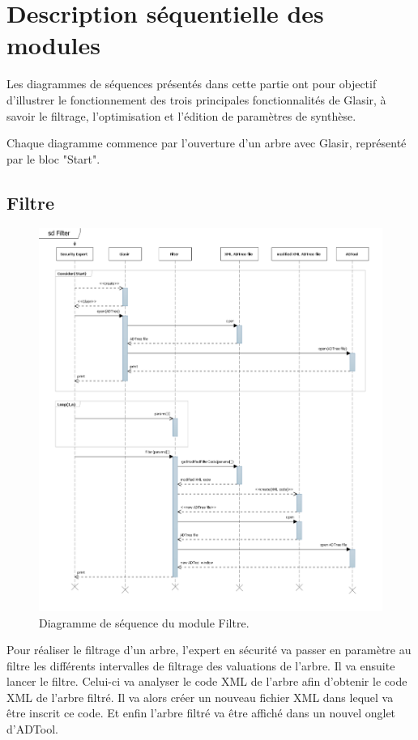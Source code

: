 \section{Description séquentielle des modules}
    \label{sec:modules}
    
Les diagrammes de séquences présentés dans cette partie ont pour objectif d'illustrer le fonctionnement des trois principales fonctionnalités de Glasir, à savoir le filtrage, l'optimisation et l'édition de paramètres de synthèse.

Chaque diagramme commence par l'ouverture d'un arbre avec Glasir, représenté par le bloc "Start".

	\subsection{Filtre}

	    \begin{figure}[H]
	        \centering
	        \includegraphics[height=1\textwidth]{figure/Filter.png}
	        \caption{Diagramme de séquence du module Filtre.}
	        \label{fig:filter}
	    \end{figure}

Pour réaliser le filtrage d'un arbre, l'expert en sécurité va passer en paramètre au filtre les différents intervalles de filtrage des valuations de l'arbre. Il va ensuite lancer le filtre. Celui-ci va analyser le code XML de l'arbre afin d'obtenir le code XML de l'arbre filtré. Il va alors créer un nouveau fichier XML dans lequel va être inscrit ce code. Et enfin l'arbre filtré va être affiché dans un nouvel onglet d'ADTool.

